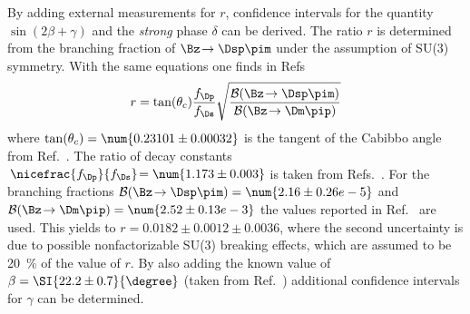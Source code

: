 By adding external measurements for $r$, confidence intervals for the quantity $\sin\!\left(2\beta+\gamma\right)$ and the \emph{strong} phase $\delta$ can be derived.
The ratio $r$ is determined from the branching fraction of $\Bz\!\to\Dsp\pim$ under the assumption of SU(3) symmetry.
With the same equations one finds in Refs~\cite{Aubert:2008zi, Das:2010be}
\begin{equation}
r=\tan(\theta_c)\frac{f_\Dp}{f_\Ds}\sqrt{\frac{\mathcal{B}\!\left(\Bz\!\to\Dsp\pim\right)}{\mathcal{B}\!\left(\Bz\!\to\Dm\pip\right)}}
\end{equation}
where $\tan(\theta_c)=\num{0.23101\pm0.00032}$ is the tangent of the Cabibbo angle from Ref.~\cite{CKMfitter2015}.
The ratio of decay constants $\,\nicefrac{f_\Dp}{f_\Ds}\!=\num{1.173\pm0.003}$ is taken from Refs.~\cite{Aoki:2016frl, Bazavov:2014wgs, Carrasco:2014poa}.
For the branching fractions \mbox{$\mathcal{B}\!\left(\Bz\!\to\Dsp\pim\right)=\num{2.16\pm0.26 e-5}$} and \mbox{$\mathcal{B}\!\left(\Bz\!\to\Dm\pip\right)=\num{2.52\pm0.13 e-3}$} the values reported in Ref.~\cite{PDG_2017} are used.
This yields to $r=0.0182\pm0.0012\pm0.0036$, where the second uncertainty is due to possible nonfactorizable SU(3) breaking effects, which are assumed to be \SI{20}{\percent} of the value of $r$.
By also adding the known value of $\beta=\SI{22.2\pm0.7}{\degree}$ (taken from Ref.~\cite{HFLAV2016}) additional confidence intervals for $\gamma$ can be determined.

